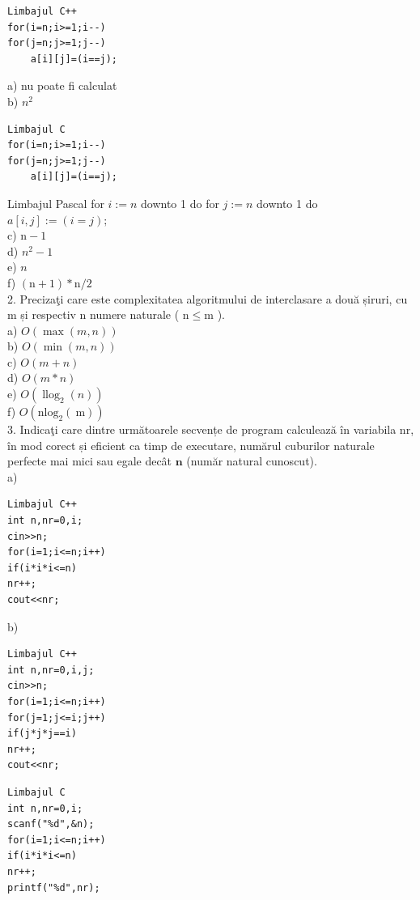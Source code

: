 \documentclass[10pt]{article}
\begin{document}
\begin{verbatim}
Limbajul C++
for(i=n;i>=1;i--)
for(j=n;j>=1;j--)
    a[i][j]=(i==j);
\end{verbatim}

a) nu poate fi calculat\\
b) $n^{2}$

\begin{verbatim}
Limbajul C
for(i=n;i>=1;i--)
for(j=n;j>=1;j--)
    a[i][j]=(i==j);
\end{verbatim}

Limbajul Pascal for $i:=n$ downto 1 do for $j:=n$ downto 1 do\\
$a[i, j]:=(i=j) ;$\\
c) $\mathrm{n}-1$\\
d) $n^{2}-1$\\
e) $n$\\
f) $(\mathrm{n}+1) * \mathrm{n} / 2$\\
2. Precizaţi care este complexitatea algoritmului de interclasare a două șiruri, cu m și respectiv n numere naturale ( $\mathrm{n} \leq \mathrm{m}$ ).\\
a) $O(\max (m, n))$\\
b) $O(\min (m, n))$\\
c) $O(m+n)$\\
d) $O(m * n)$\\
e) $O\left(\operatorname{llog}_{2}(n)\right)$\\
f) $O\left(\mathrm{nlog}_{2}(\mathrm{~m})\right)$\\
3. Indicaţi care dintre următoarele secvențe de program calculează în variabila nr, în mod corect și eficient ca timp de executare, numărul cuburilor naturale perfecte mai mici sau egale decât $\mathbf{n}$ (număr natural cunoscut).\\
a)

\begin{verbatim}
Limbajul C++
int n,nr=0,i;
cin>>n;
for(i=1;i<=n;i++)
if(i*i*i<=n)
nr++;
cout<<nr;
\end{verbatim}

b)

\begin{verbatim}
Limbajul C++
int n,nr=0,i,j;
cin>>n;
for(i=1;i<=n;i++)
for(j=1;j<=i;j++)
if(j*j*j==i)
nr++;
cout<<nr;
\end{verbatim}

\begin{verbatim}
Limbajul C
int n,nr=0,i;
scanf("%d",&n);
for(i=1;i<=n;i++)
if(i*i*i<=n)
nr++;
printf("%d",nr);
\end{verbatim}
\end{document}
